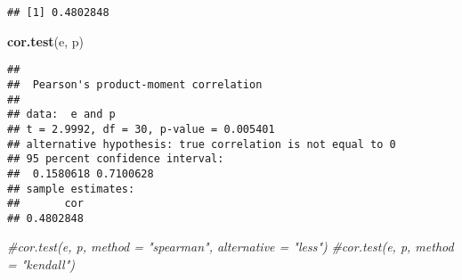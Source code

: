 \documentclass[
]{article}
\newenvironment{Shaded}{\begin{snugshade}}{\end{snugshade}}
\newcommand{\CommentTok}[1]{\textcolor[rgb]{0.56,0.35,0.01}{\textit{#1}}}
\newcommand{\KeywordTok}[1]{\textcolor[rgb]{0.13,0.29,0.53}{\textbf{#1}}}
\newcommand{\NormalTok}[1]{#1}
\begin{document}
\begin{verbatim}
## [1] 0.4802848
\end{verbatim}

\begin{Shaded}
\begin{Highlighting}[]
\KeywordTok{cor.test}\NormalTok{(e, p)}
\end{Highlighting}
\end{Shaded}

\begin{verbatim}
## 
##  Pearson's product-moment correlation
## 
## data:  e and p
## t = 2.9992, df = 30, p-value = 0.005401
## alternative hypothesis: true correlation is not equal to 0
## 95 percent confidence interval:
##  0.1580618 0.7100628
## sample estimates:
##       cor 
## 0.4802848
\end{verbatim}

\begin{Shaded}
\begin{Highlighting}[]
\CommentTok{#cor.test(e, p, method = "spearman", alternative = "less")}
\CommentTok{#cor.test(e, p, method = "kendall")}
\end{Highlighting}
\end{Shaded}
\end{document}
